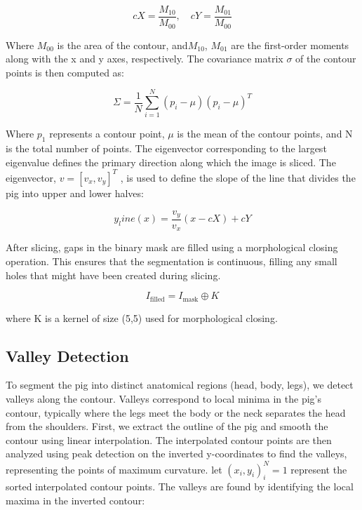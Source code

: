 {\begin{equation}
	cX = \frac{M_{10}}{M_{00}}, \quad cY = \frac{M_{01}}{M_{00}}
\end{equation}

Where $M_00$ is the area of the contour, and$M_10$, $M_01$ are the first-order moments along with the x and y axes, respectively.
The covariance matrix $\sigma$ of the contour points is then computed as:

\begin{equation}
	\Sigma = \frac{1}{N} \sum_{i=1}^{N} (p_i - \mu)(p_i - \mu)^T
\end{equation}

Where $p_1$ represents a contour point, $\mu$ is the mean of the contour points, and N is the total number of points. The eigenvector corresponding to the largest eigenvalue defines the primary direction along which the image is sliced. The eigenvector, $v=[v_x, v_y]^T$ , is used to define the slope of the line that divides the pig into upper and lower halves:

\begin{equation}
	y_line(x)=\frac{v_y}{v_x} (x-cX) + cY
\end{equation}

After slicing, gaps in the binary mask are filled using a morphological closing operation. This ensures that the segmentation is continuous, filling any small holes that might have been created during slicing.

\begin{equation}
	I_{\text{filled}} = I_{\text{mask}} \oplus K
\end{equation}

where K is a kernel of size (5,5) used for morphological closing.

\subsection{Valley Detection}
To segment the pig into distinct anatomical regions (head, body, legs), we detect valleys along the contour. Valleys correspond to local minima in the pig’s contour, typically where the legs meet the body or the neck separates the head from the shoulders.
First, we extract the outline of the pig and smooth the contour using linear interpolation. The interpolated contour points are then analyzed using peak detection on the inverted y-coordinates to find the valleys, representing the points of maximum curvature.
let ${(x_i, y_i)}^N _i=1$ represent the sorted interpolated contour points. The valleys are found by identifying the local maxima in the inverted contour:

}

